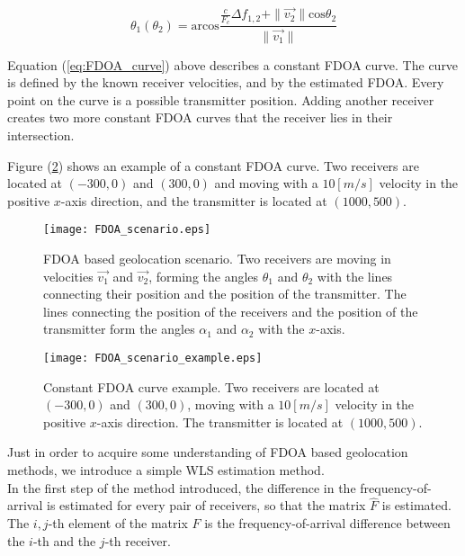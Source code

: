 \begin{equation}
\label{eq:FDOA_curve}
\theta_1(\theta_2) = \text{arcos}\frac{\frac{c}{F_c}\Delta f_{1,2} + \|\vec{v_2}\|\text{cos}\theta_2}{\|\vec{v_1}\|}
\end{equation}

Equation (\ref{eq:FDOA_curve}) above describes a constant FDOA curve. The curve is defined by the known receiver velocities, and by the estimated FDOA. Every point on the curve is a possible transmitter position. Adding another receiver creates two more constant FDOA curves that the receiver lies in their intersection.

Figure (\ref{fig:FDOA_scenario_example}) shows an example of a constant FDOA curve. Two receivers are located at $(-300,0)$ and $(300,0)$ and moving with a $10[m/s]$ velocity in the positive $x$-axis direction, and the transmitter is located at $(1000,500)$.

\begin{figure}
\begin{center}
\texttt{[image: FDOA\_scenario.eps]}
\end{center}
\caption{FDOA based geolocation scenario. Two receivers are moving in velocities $\vec{v_1}$ and $\vec{v_2}$, forming the angles $\theta_1$ and $\theta_2$ with the lines connecting their position and the position of the transmitter. The lines connecting the position of the receivers and the position of the transmitter form the angles $\alpha_1$ and $\alpha_2$ with the $x$-axis.}
\label{fig:FDOA_scenario}
\end{figure}

\begin{figure}
\begin{center}
\texttt{[image: FDOA\_scenario\_example.eps]}
\end{center}
\caption{Constant FDOA curve example. Two receivers are located at $(-300,0)$ and $(300,0)$, moving with a $10[m/s]$ velocity in the positive $x$-axis direction. The transmitter is located at $(1000,500)$.}
\label{fig:FDOA_scenario_example}
\end{figure}

Just in order to acquire some understanding of FDOA based geolocation methods, we introduce a simple WLS estimation method.\\

In the first step of the method introduced, the difference in the frequency-of-arrival is estimated for every pair of receivers, so that the matrix $\hat{F}$ is estimated. The $i,j$-th element of the matrix $\hat{F}$ is the frequency-of-arrival difference between the $i$-th and the $j$-th receiver.\\


